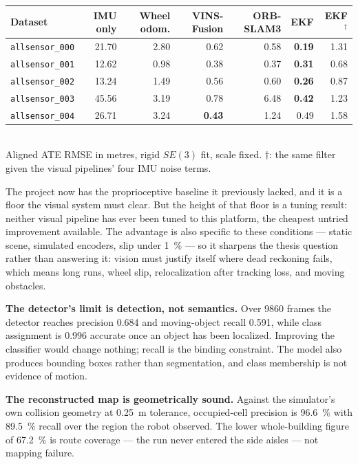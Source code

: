 \documentclass[11pt,a4paper]{article}
\begin{document}
\vspace{-0.7em}
\begin{center}\small
\begin{tabular}{lrrrrrr}
\toprule
Dataset & IMU only & Wheel odom. & VINS-Fusion & ORB-SLAM3 & EKF & EKF$^\dagger$ \\
\midrule
\texttt{allsensor\_000} & 21.70 & 2.80 & 0.62 & 0.58 & \textbf{0.19} & 1.31 \\
\texttt{allsensor\_001} & 12.62 & 0.98 & 0.38 & 0.37 & \textbf{0.31} & 0.68 \\
\texttt{allsensor\_002} & 13.24 & 1.49 & 0.56 & 0.60 & \textbf{0.26} & 0.87 \\
\texttt{allsensor\_003} & 45.56 & 3.19 & 0.78 & 6.48 & \textbf{0.42} & 1.23 \\
\texttt{allsensor\_004} & 26.71 & 3.24 & \textbf{0.43} & 1.24 & 0.49 & 1.58 \\
\bottomrule
\end{tabular}\\[0.3em]
\footnotesize Aligned ATE RMSE in metres, rigid $SE(3)$ fit, scale fixed.
$\dagger$: the same filter given the visual pipelines' four IMU noise terms.
\end{center}
\vspace{-0.9em}

The project now has the proprioceptive baseline it previously lacked, and it is a
floor the visual system must clear. But the height of that floor is a tuning
result: neither visual pipeline has ever been tuned to this platform, the
cheapest untried improvement available. The advantage is also specific to these
conditions --- static scene, simulated encoders, slip under \SI{1}{\percent} ---
so it sharpens the thesis question rather than answering it: vision must justify
itself where dead reckoning fails, which means long runs, wheel slip,
relocalization after tracking loss, and moving obstacles.

\textbf{The detector's limit is detection, not semantics.} Over \num{9860}
frames the detector reaches precision 0.684 and moving-object recall 0.591, while
class assignment is 0.996 accurate once an object has been localized. Improving
the classifier would change nothing; recall is the binding constraint. The model
also produces bounding boxes rather than segmentation, and class membership is
not evidence of motion.

\textbf{The reconstructed map is geometrically sound.} Against the simulator's own
collision geometry at \SI{0.25}{\metre} tolerance, occupied-cell precision is
\SI{96.6}{\percent} with \SI{89.5}{\percent} recall over the region the robot
observed. The lower whole-building figure of \SI{67.2}{\percent} is route
coverage --- the run never entered the side aisles --- not mapping failure.
\end{document}
